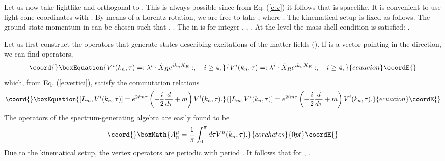 \documentclass[a4paper,aps,prd,twocolumn,groupedaddress]{revtex4}
\begin{document}
Let us now take \coordHE{} lightlike and orthogonal to \coordHE{}. This is always
possible since from Eq. (\ref{e:v}) it follows that \coordHE{} is
spacelike. It is convenient to use light-cone coordinates \coordHE{} with \coordHE{}. By
means of a Lorentz rotation, we are free to take
\coordHE{}, where \coordHE{}. The kinematical
setup is fixed as follows.  The ground state momentum \coordHE{} in
\coordHE{} can be chosen such that \coordHE{},
\coordHE{}. The \coordHE{} in \coordHE{} is \coordHE{}
for integer \coordHE{}. \coordHE{}, \coordHE{}. At the level \coordHE{} the
mass-shell condition is satisfied: \coordHE{}.

Let us first construct the operators that generate states describing
excitations of the matter fields (\coordHE{}).  If \coordHE{} is a
vector pointing in the \coordHE{} direction, we can find \coordHE{} operators,
\begin{equation}\coord{}\boxEquation{\label{e:norm}
V^i(k_n,\tau) = :\lambda^i\cdot\dot{X}_R e^{ik_nX_R}:, \quad i\ge 4 ,
}{V^i(k_n,\tau) = :\lambda^i\cdot\dot{X}_R e^{ik_nX_R}:, \quad i\ge 4 ,
}{ecuacion}\coordE{}\end{equation}
which, from Eq. (\ref{e:vertici}), satisfy the commutation relations
\begin{equation}\coord{}\boxEquation{\label{e:buona}
[L_m,V^i(k_n,\tau)] = e^{2im\tau}\left
 ( -\frac{i}{2}\frac{d}{d\tau} +m
 \right)V^i(k_n,\tau).
}{[L_m,V^i(k_n,\tau)] = e^{2im\tau}\left
 ( -\frac{i}{2}\frac{d}{d\tau} +m
 \right)V^i(k_n,\tau).
}{ecuacion}\coordE{}\end{equation}
The operators of the spectrum-generating algebra \coordHE{} are easily
found to be
\begin{displaymath}\coord{}\boxMath{
A^\mu_n = \frac{1}{\pi}\int_0^{\pi}d\tau V^\mu(k_n,\tau).
}{corchetes}{0pt}\coordE{}\end{displaymath}
Due to the kinematical setup, the vertex operators \coordHE{} are
periodic with period \myHighlight{$\pi$}\coordHE{}. It follows that for
\coordHE{}, \coordHE{} .
\end{document}
